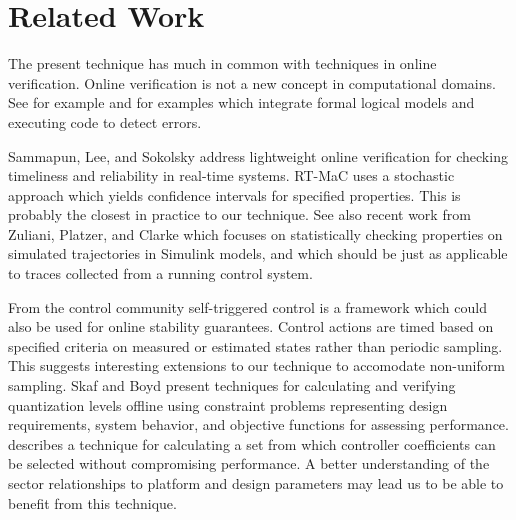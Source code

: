 
\section{Related Work}
\label{section:related}

The present technique has much in common with techniques in online verification. 
Online verification is not a new concept in computational domains.  See for example 
\cite{verif:onlinerules} and \cite{verif:pathfinder} for examples which integrate formal logical 
models and executing code to detect errors.

Sammapun, Lee, and Sokolsky\cite{online:rtmac} address lightweight online verification for 
checking timeliness and reliability in real-time systems.  RT-MaC uses a stochastic approach which 
yields confidence intervals for specified properties.  This is probably the closest in practice
to our technique.  See also recent work from Zuliani, Platzer, and Clarke 
\cite{verif:bayesian} which focuses on statistically checking properties on simulated 
trajectories in Simulink models, and which should be just as applicable to traces collected
from a running control system.


From the control community self-triggered control\cite{control:selftriggered} is a framework 
which could also be used for online stability guarantees.  Control actions are timed based on 
specified criteria on measured or estimated states rather than periodic sampling.  This 
suggests interesting extensions to our technique to accomodate non-uniform sampling.
Skaf and Boyd present techniques for calculating and verifying quantization levels offline
using constraint problems representing design requirements, system behavior, and 
objective functions for assessing performance\cite{opt:trunc1}. \cite{opt:trunc} describes
a technique for calculating a set from which controller coefficients can be selected without
compromising performance.  A better understanding of the sector relationships to platform
and design parameters may lead us to be able to benefit from this technique.

